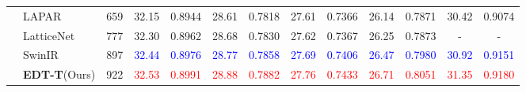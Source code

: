 \documentclass[runningheads]{llncs}
\begin{document}
\begin{table}[t]
\begin{center}
{\begin{tabular}{| c | l | c | c | c | c | c | c | c | c | c | c | c |}
\multirow{4}{*}{} & LAPAR~\cite{li2020lapar} & 659 & 32.15 & 0.8944 & 28.61 & 0.7818 & 27.61 & 0.7366 & 26.14 & 0.7871 & 30.42 & 0.9074 \\
					~ & LatticeNet~\cite{luo2020latticenet} & 777 & 32.30 & 0.8962 & 28.68 & 0.7830 & 27.62 & 0.7367 & 26.25 & 0.7873 & - & - \\
					~ & SwinIR{}~\cite{liang2021swinir} & 897 & \textcolor{blue}{32.44} & \textcolor{blue}{0.8976} & \textcolor{blue}{28.77} & \textcolor{blue}{0.7858} & \textcolor{blue}{27.69} & \textcolor{blue}{0.7406} & \textcolor{blue}{26.47} & \textcolor{blue}{0.7980} & \textcolor{blue}{30.92} & \textcolor{blue}{0.9151} \\
					~ & \textbf{EDT-T}(Ours) & 922 & \textcolor{red}{32.53} & \textcolor{red}{0.8991} & \textcolor{red}{28.88} & \textcolor{red}{0.7882} & \textcolor{red}{27.76} & \textcolor{red}{0.7433} & \textcolor{red}{26.71} & \textcolor{red}{0.8051} & \textcolor{red}{31.35} & \textcolor{red}{0.9180} \\
					\hline
				\end{tabular}
			}
		\end{center}
		\vspace{-0.05in}
\label{tab:lightweight_sr}
	\end{table}
	
\end{document}
